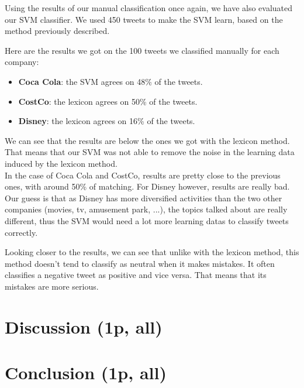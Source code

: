 \documentclass[a4paper,11pt]{report}
\begin{document}
Using the results  of our manual classification once again, we have also evaluated our SVM classifier.
We used 450 tweets to make the SVM learn, based on the method previously described.

Here are the results we got on the 100 tweets we classified manually for each company:
\begin{itemize}
        \item \textbf{Coca Cola}: the SVM agrees on 48\% of the tweets.
        \item \textbf{CostCo}: the lexicon agrees on 50\% of the tweets.
        \item \textbf{Disney}: the lexicon agrees on 16\% of the tweets.
\end{itemize}
We can see that the results are below the ones we got with the lexicon method.
That means that our SVM was not able to remove the noise in the learning data induced by the lexicon method.\\
In the case of Coca Cola and CostCo, results are pretty close to the previous ones, with around 50\% of matching.
For Disney however, results are really bad. Our guess  is that as Disney has more diversified activities than the two other companies (movies, tv, amusement park, ...), the topics talked about are really different, thus the SVM would need a lot more learning datas to classify tweets correctly.

Looking closer to the results, we can see that unlike with the lexicon method, this method doesn't tend to classify as neutral when it makes mistakes.
It often classifies a negative tweet as positive and vice versa.
That means that its mistakes are more serious.

\chapter{Discussion (1p, all)}

\chapter{Conclusion (1p, all)}
\end{document}

